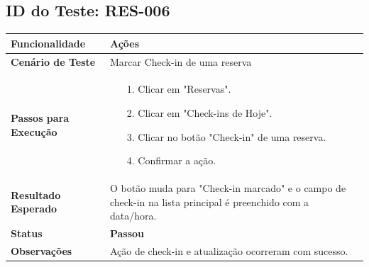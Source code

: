 \documentclass[
	12pt,				%
	openany,			%
	oneside,			%
	a4paper,			%
	english,			%
	french,				%
	spanish,			%
	brazil				%
	]{abntex2}
\begin{document}
\begin{apendicesenv}
\subsection*{ID do Teste: RES-006}
\begin{tabular}{@{} p{5cm} p{11cm} @{}}
	\toprule
	\textbf{Funcionalidade} & Ações \\
	\midrule
	\textbf{Cenário de Teste} & Marcar Check-in de uma reserva \\
	\midrule
	\textbf{Passos para Execução} &
	\begin{itemize} \itemsep0em 
		\item[1.] Clicar em "Reservas".
		\item[2.] Clicar em "Check-ins de Hoje".
		\item[3.] Clicar no botão "Check-in" de uma reserva.
		\item[4.] Confirmar a ação.
	\end{itemize} \\
	\midrule
	\textbf{Resultado Esperado} & O botão muda para "Check-in marcado" e o campo de check-in na lista principal é preenchido com a data/hora. \\
	\midrule
	\textbf{Status} & \textbf{Passou} \\
	\midrule
	\textbf{Observações} & Ação de check-in e atualização ocorreram com sucesso. \\
	\bottomrule
\end{tabular}
\newpage


\end{apendicesenv}
\end{document}
